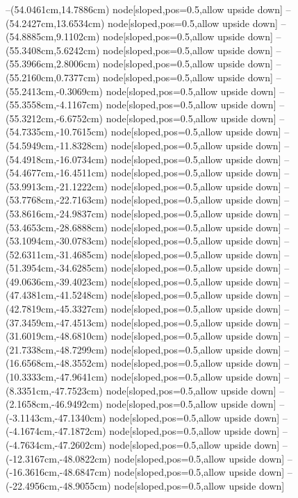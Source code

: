 --(54.0461cm,14.7886cm) node[sloped,pos=0.5,allow upside down]{\arrowIn}
--(54.2427cm,13.6534cm) node[sloped,pos=0.5,allow upside down]{\ArrowIn}
--(54.8885cm,9.1102cm) node[sloped,pos=0.5,allow upside down]{\ArrowIn}
--(55.3408cm,5.6242cm) node[sloped,pos=0.5,allow upside down]{\ArrowIn}
--(55.3966cm,2.8006cm) node[sloped,pos=0.5,allow upside down]{\ArrowIn}
--(55.2160cm,0.7377cm) node[sloped,pos=0.5,allow upside down]{\ArrowIn}
--(55.2413cm,-0.3069cm) node[sloped,pos=0.5,allow upside down]{\ArrowIn}
--(55.3558cm,-4.1167cm) node[sloped,pos=0.5,allow upside down]{\ArrowIn}
--(55.3212cm,-6.6752cm) node[sloped,pos=0.5,allow upside down]{\ArrowIn}
--(54.7335cm,-10.7615cm) node[sloped,pos=0.5,allow upside down]{\ArrowIn}
--(54.5949cm,-11.8328cm) node[sloped,pos=0.5,allow upside down]{\ArrowIn}
--(54.4918cm,-16.0734cm) node[sloped,pos=0.5,allow upside down]{\ArrowIn}
--(54.4677cm,-16.4511cm) node[sloped,pos=0.5,allow upside down]{\arrowIn}
--(53.9913cm,-21.1222cm) node[sloped,pos=0.5,allow upside down]{\ArrowIn}
--(53.7768cm,-22.7163cm) node[sloped,pos=0.5,allow upside down]{\ArrowIn}
--(53.8616cm,-24.9837cm) node[sloped,pos=0.5,allow upside down]{\ArrowIn}
--(53.4653cm,-28.6888cm) node[sloped,pos=0.5,allow upside down]{\ArrowIn}
--(53.1094cm,-30.0783cm) node[sloped,pos=0.5,allow upside down]{\ArrowIn}
--(52.6311cm,-31.4685cm) node[sloped,pos=0.5,allow upside down]{\ArrowIn}
--(51.3954cm,-34.6285cm) node[sloped,pos=0.5,allow upside down]{\ArrowIn}
--(49.0636cm,-39.4023cm) node[sloped,pos=0.5,allow upside down]{\ArrowIn}
--(47.4381cm,-41.5248cm) node[sloped,pos=0.5,allow upside down]{\ArrowIn}
--(42.7819cm,-45.3327cm) node[sloped,pos=0.5,allow upside down]{\ArrowIn}
--(37.3459cm,-47.4513cm) node[sloped,pos=0.5,allow upside down]{\ArrowIn}
--(31.6019cm,-48.6810cm) node[sloped,pos=0.5,allow upside down]{\ArrowIn}
--(21.7338cm,-48.7299cm) node[sloped,pos=0.5,allow upside down]{\ArrowIn}
--(16.6568cm,-48.3552cm) node[sloped,pos=0.5,allow upside down]{\ArrowIn}
--(10.3333cm,-47.9641cm) node[sloped,pos=0.5,allow upside down]{\ArrowIn}
--(8.3351cm,-47.7523cm) node[sloped,pos=0.5,allow upside down]{\ArrowIn}
--(2.1658cm,-46.9492cm) node[sloped,pos=0.5,allow upside down]{\ArrowIn}
--(-3.1143cm,-47.1340cm) node[sloped,pos=0.5,allow upside down]{\ArrowIn}
--(-4.1674cm,-47.1872cm) node[sloped,pos=0.5,allow upside down]{\ArrowIn}
--(-4.7634cm,-47.2602cm) node[sloped,pos=0.5,allow upside down]{\arrowIn}
--(-12.3167cm,-48.0822cm) node[sloped,pos=0.5,allow upside down]{\ArrowIn}
--(-16.3616cm,-48.6847cm) node[sloped,pos=0.5,allow upside down]{\ArrowIn}
--(-22.4956cm,-48.9055cm) node[sloped,pos=0.5,allow upside down]{\ArrowIn}
